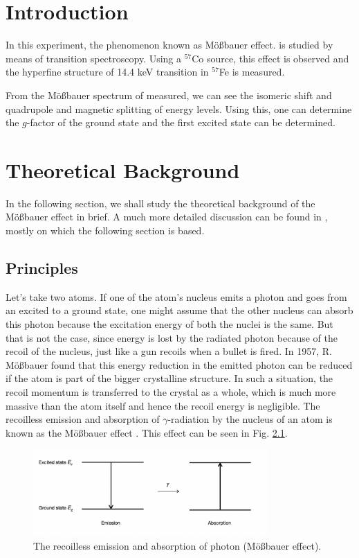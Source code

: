 \documentclass[a4paper]{report}
\numberwithin{equation}{section}
\begin{document}
\tableofcontents

\chapter{Introduction}

In this experiment, the phenomenon known as M\"o{\ss}bauer effect. is studied by means of transition spectroscopy. Using a $^{57}$Co source, this effect is observed and the hyperfine structure of 14.4 keV transition in $^{57}$Fe is measured. 

From the M\"o{\ss}bauer spectrum of measured, we can see the isomeric shift and quadrupole and magnetic splitting of energy levels. Using this, one can determine the $g$-factor of the ground state and the first excited state can be determined. 

\chapter{Theoretical Background}
In the following section, we shall study the theoretical background of the M\"o{\ss}bauer effect in brief. A much more detailed discussion can be found in \cite{Schatz1996}, mostly on which the following section is based.

\section{Principles} \label{sec:principles}

Let's take two atoms. If one of the atom's nucleus emits a photon and goes from an excited to a ground state, one might assume that the other nucleus can absorb this photon because the excitation energy of both the nuclei is the same. But that is not the case, since energy is lost by the radiated photon because of the recoil of the nucleus, just like a gun recoils when a bullet is fired. In 1957, R. M\"o{\ss}bauer found that this energy reduction in the emitted photon can be reduced if the atom is part of the bigger crystalline structure. In such a situation, the recoil momentum is transferred to the crystal as a whole, which is much more massive than the atom itself and hence the recoil energy is negligible. The recoilless emission and absorption of $\gamma $-radiation by the nucleus of an atom is known as the M\"o{\ss}bauer effect \cite{Schatz1996}. This effect can be seen in Fig. \ref{fig:moess}.

\begin{figure}[htpb]
    \centering
    \includegraphics[width=0.8\textwidth]{moessbauer-effect}
    \caption{The recoilless emission and absorption of photon (M\"o{\ss}bauer effect).}
    \label{fig:moess}
\end{figure}
\end{document}
